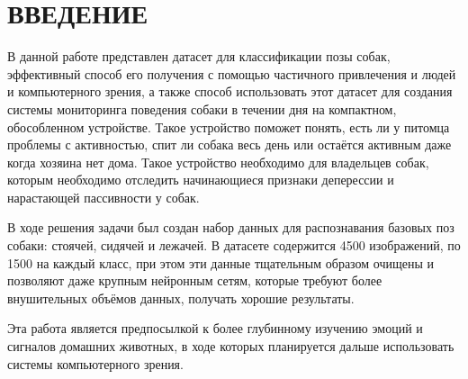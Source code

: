 \chapter*{ВВЕДЕНИЕ}							%

В данной работе представлен датасет для классификации позы собак, эффективный способ его получения с помощью частичного привлечения и людей и компьютерного зрения, а также способ использовать этот датасет для создания системы мониторинга поведения собаки в течении дня на компактном, обособленном устройстве. Такое устройство поможет понять, есть ли у питомца проблемы с активностью, спит ли собака весь день или остаётся активным даже когда хозяина нет дома. Такое устройство необходимо для владельцев собак, которым необходимо отследить начинающиеся признаки деперессии и нарастающей пассивности у собак.

В ходе решения задачи был создан набор данных для распознавания базовых поз собаки: стоячей, сидячей и лежачей. В датасете содержится 4500 изображений, по 1500 на каждый класс, при этом эти данные тщательным образом очищены и позволяют даже крупным нейронным сетям, которые требуют более внушительных объёмов данных, получать хорошие результаты.

Эта работа является предпосылкой к более глубинному изучению эмоций и сигналов домашних животных, в ходе которых планируется дальше использовать системы компьютерного зрения.